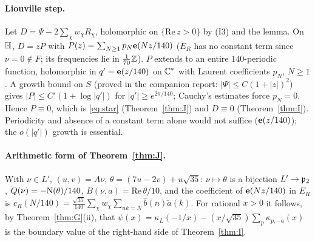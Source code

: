 \paragraph{Liouville step.} Let $D=\Psi-2\sum_\chi w_\chi R_\chi$, holomorphic on $\{\mathrm{Re}\,z>0\}$ by (I3) and the lemma. On $\mathbb{H}$, $D=zP$ with
$P(z)=\sum_{N\ge1}p_N\mathbf{e}(Nz/140)$ ($E_R$ has no constant term since $\nu=0\notin F$; its frequencies lie in $\tfrac1{70}\mathbb{Z}$). $P$ extends to an entire
$140$-periodic function, holomorphic in $q'=\mathbf{e}(z/140)$ on $\mathbb{C}^\ast$ with Laurent coefficients $p_N$, $N\ge1$. A growth bound on $S$ (proved in the companion report:
$|\Psi|\le C(1+|z|)^2$) gives $|P|\le C'(1+\log|q'|)$ for $|q'|\ge e^{2\pi/140}$; Cauchy's estimates force $p_N=0$. Hence $P\equiv0$, which is
\eqref{eq:star} (Theorem~\ref{thm:J}) and $D\equiv0$ (Theorem~\ref{thm:I}). Periodicity and absence of a constant term alone would not suffice
($\mathbf{e}(z/140)$); the $o(|q'|)$ growth is essential.

\paragraph{Arithmetic form of Theorem~\ref{thm:J}.} With $\nu\in L'$, $(u,v)=A\nu$, $\theta=(7u-2v)+u\sqrt{35}$: $\nu\mapsto\theta$ is a bijection
$L'\to\mathfrak{p}_2$, $Q(\nu)=-\mathrm{N}(\theta)/140$, $B(\nu,a)=\mathrm{Re}\,\theta/10$, and the coefficient of $\mathbf{e}(Nz/140)$ in $E_R$ is
$c_R(N/140)=\tfrac{\sqrt{35}}{140}\sum_\chi w_\chi\sum_{nk=N}\widehat b(n)\check a(k)$.
For rational $x>0$ it follows, by Theorem~\ref{thm:G}(ii), that $\psi(x)=\kappa_L(-1/x)-(x/\sqrt{35})\sum_p\kappa_{p,-a}(x)$ is the boundary value of the
right-hand side of Theorem~\ref{thm:I}.

